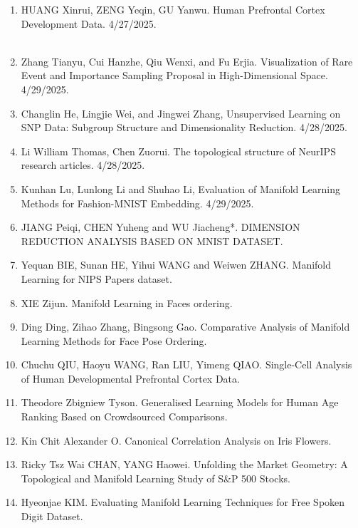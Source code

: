 \documentclass[11pt]{article}
\begin{document}
\begin{enumerate}
\item HUANG Xinrui, ZENG Yeqin, GU Yanwu. Human Prefrontal Cortex Development Data. 4/27/2025. \\\
\item Zhang Tianyu, Cui Hanzhe, Qiu Wenxi, and Fu Erjia. Visualization of Rare Event and Importance Sampling Proposal in High-Dimensional Space. 4/29/2025. \\ 
\item Changlin He,  Lingjie Wei, and Jingwei Zhang, Unsupervised Learning on SNP Data: Subgroup Structure and Dimensionality Reduction. 4/28/2025. \\
\item Li William Thomas, Chen Zuorui. The topological structure of NeurIPS research articles. 4/28/2025. \\
\item Kunhan Lu, Lunlong Li and Shuhao Li, Evaluation of Manifold Learning Methods for Fashion-MNIST Embedding. 4/29/2025. \\
\item JIANG Peiqi, CHEN Yuheng and WU Jiacheng*. DIMENSION REDUCTION ANALYSIS BASED ON MNIST DATASET.  \\
\item Yequan BIE, Sunan HE, Yihui WANG and Weiwen ZHANG. Manifold Learning for NIPS Papers dataset. \\
\item XIE Zijun. Manifold Learning in Faces ordering. \\
\item Ding Ding, Zihao Zhang, Bingsong Gao. Comparative Analysis of Manifold Learning Methods for Face Pose Ordering. \\
\item Chuchu QIU, Haoyu WANG, Ran LIU, Yimeng QIAO. Single-Cell Analysis of Human Developmental Prefrontal Cortex Data. \\ 
\item Theodore Zbigniew Tyson. Generalised Learning Models for Human Age Ranking Based on Crowdsourced Comparisons.  \\
\item Kin Chit Alexander O. Canonical Correlation Analysis on Iris Flowers. \\
\item Ricky Tsz Wai CHAN, YANG Haowei. Unfolding the Market Geometry: A Topological and Manifold Learning Study of S\&P 500 Stocks. \\
\item Hyeonjae KIM. Evaluating Manifold Learning Techniques for Free Spoken Digit Dataset. \\

\end{enumerate}
\end{document}
